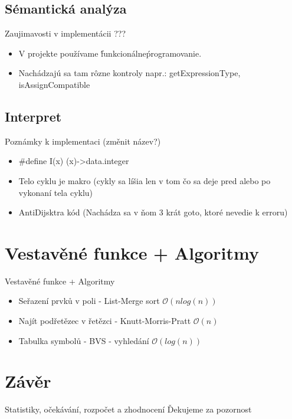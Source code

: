 \documentclass[13pt]{beamer}
\begin{document}
\subsection{Sémantická analýza}

\begin{frame}{Zaujimavosti v implementácii ???}
  \begin{itemize}
    \item V projekte používame \'funkcionálne\' programovanie.
    \item Nachádzajú sa tam rôzne kontroly napr.: \ttfamily getExpressionType, isAssignCompatible
    \sffamily
  \end{itemize}
\end{frame}

\subsection{Interpret}

\begin{frame}{Poznámky k implementaci (změnit název?)}

  \begin{itemize}
    \item \ttfamily \par\#define I(x) (x)->data.integer
    \item \sffamily Telo cyklu je makro (cykly sa líšia len v tom čo sa deje pred alebo po vykonaní tela cyklu)
    \item AntiDijsktra kód (Nachádza sa v ňom 3 krát goto, ktoré nevedie k erroru)
  \end{itemize}

\end{frame}

\section{Vestavěné funkce + Algoritmy}

\begin{frame}{Vestavěné funkce + Algoritmy}

  \begin{itemize}
    \item Seřazení prvků v poli - List-Merge sort $\mathcal{O}(n log(n))$
    \item Najít podřetězec v řetězci - Knutt-Morris-Pratt $\mathcal{O}(n)$
    \item Tabulka symbolů - BVS - vyhledání $\mathcal{O}(log (n))$
  \end{itemize}
\end{frame}

\section{Závěr}

\begin{frame}{Statistiky, očekávání, rozpočet a zhodnocení}
Ďekujeme za pozornost
\end{frame}
\end{document}
